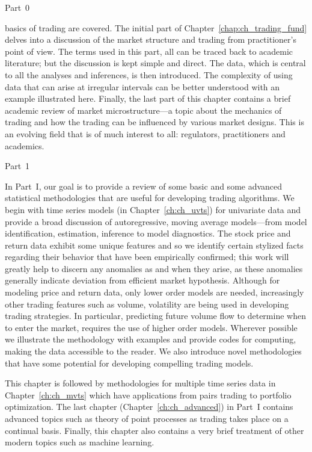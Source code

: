\noindent Part~0 \par\vspace{2\baselineskip}

basics of trading are covered. The initial part of Chapter~\ref{chap:ch_trading_fund} delves into a discussion of the market structure and trading from practitioner's point of view. The terms used in this part, all can be traced back to academic literature; but the discussion is kept simple and direct. The data, which is central to all the analyses and inferences, is then introduced. The complexity of using data that can arise at irregular intervals can be better understood with an example illustrated here. Finally, the last part of this chapter contains a brief academic review of market microstructure---a topic about the mechanics of trading and how the trading can be influenced by various market designs. This is an evolving field that is of much interest to all: regulators, practitioners and academics. 



\noindent Part~1 \par\vspace{2\baselineskip}

In Part~I, our goal is to provide a review of some basic and some advanced statistical methodologies that are useful for developing trading algorithms. We begin with time series models (in Chapter~\ref{ch:ch_uvts}) for univariate data and provide a broad discussion of autoregressive, moving average models---from model identification, estimation, inference to model diagnostics. The stock price and return data exhibit some unique features and so we identify certain stylized facts regarding their behavior that have been empirically confirmed; this work will greatly help to discern any anomalies as and when they arise, as these anomalies generally indicate deviation from efficient market hypothesis. Although for modeling price and return data, only lower order models are needed, increasingly other trading features such as volume, volatility are being used in developing trading strategies. In particular,  predicting future volume flow to determine when to enter the market, requires the use of higher order models. Wherever possible we illustrate the methodology with examples and provide codes for computing, making the data accessible to the reader. We also introduce novel methodologies that have some potential for developing compelling trading models.


This chapter is followed by methodologies for multiple time series data in Chapter~\ref{ch:ch_mvts} which have applications from pairs trading to portfolio optimization. The last chapter (Chapter~\ref{ch:ch_advanced}) in Part~I contains advanced topics such as theory of point processes as trading takes place on a continual basis. Finally, this chapter also contains a very brief treatment of other modern topics such as machine learning.


